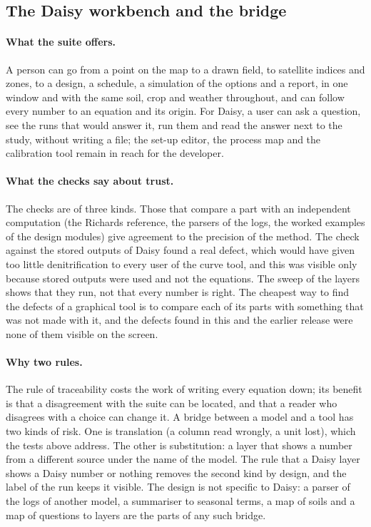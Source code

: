 \documentclass[preprint,12pt]{elsarticle}
\begin{document}
\subsection{The Daisy workbench and the bridge}\label{sec:wbdisc}
\paragraph{What the suite offers.} A person can go from a point on the map to a drawn field, to satellite indices and zones, to a design, a schedule, a simulation of the options and a report, in one window and with the same soil, crop and weather throughout, and can follow every number to an equation and its origin. For Daisy, a user can ask a question, see the runs that would answer it, run them and read the answer next to the study, without writing a file; the set-up editor, the process map and the calibration tool remain in reach for the developer.

\paragraph{What the checks say about trust.} The checks are of three kinds. Those that compare a part with an independent computation (the Richards reference, the parsers of the logs, the worked examples of the design modules) give agreement to the precision of the method. The check against the stored outputs of Daisy found a real defect, which would have given too little denitrification to every user of the curve tool, and this was visible only because stored outputs were used and not the equations. The sweep of the layers shows that they run, not that every number is right. The cheapest way to find the defects of a graphical tool is to compare each of its parts with something that was not made with it, and the defects found in this and the earlier release were none of them visible on the screen.

\paragraph{Why two rules.} The rule of traceability costs the work of writing every equation down; its benefit is that a disagreement with the suite can be located, and that a reader who disagrees with a choice can change it. A bridge between a model and a tool has two kinds of risk. One is translation (a column read wrongly, a unit lost), which the tests above address. The other is substitution: a layer that shows a number from a different source under the name of the model. The rule that a Daisy layer shows a Daisy number or nothing removes the second kind by design, and the label of the run keeps it visible. The design is not specific to Daisy: a parser of the logs of another model, a summariser to seasonal terms, a map of soils and a map of questions to layers are the parts of any such bridge.
\end{document}
